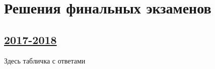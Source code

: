 \section{Решения финальных экзаменов}


\subsection[2017-2018]{\hyperref[sec:final_exam_2017_2018]{2017-2018}}
\label{sec:sol_final_exam_2017_2018}

Здесь табличка с ответами
